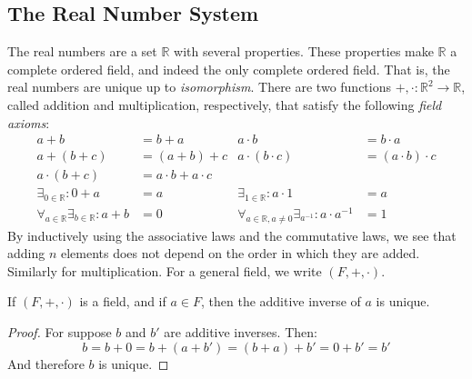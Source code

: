 \documentclass[crop=false,class=book,oneside]{standalone}
\begin{document}
        \subsection{The Real Number System}
            The real numbers are a set $\mathbb{R}$ with several
            properties. These properties make $\mathbb{R}$ a
            complete ordered field, and indeed the only complete
            ordered field. That is, the real numbers are unique
            up to \textit{isomorphism}. There are two functions
            $+,\cdot:\mathbb{R}^{2}\rightarrow\mathbb{R}$, called
            addition and multiplication, respectively, that satisfy
            the following \textit{field axioms}:
            \begin{align}
                a+b&=b+a&
                a\cdot{b}&=b\cdot{a}
                \tag{Commutativity}\\
                a+(b+c)&=(a+b)+c&
                a\cdot(b\cdot{c})&=(a\cdot{b})\cdot{c}
                \tag{Associativity}\\
                a\cdot(b+c)&=a\cdot{b}+a\cdot{c}
                \tag{Distributive Law}\\
                \exists_{0\in\mathbb{R}}:0+a&=a&
                \exists_{1\in\mathbb{R}}:a\cdot{1}&=a
                \tag{Neutral Elements}\\
                \forall_{a\in\mathbb{R}}\exists_{b\in\mathbb{R}}:
                a+b&=0&
                \forall_{a\in\mathbb{R},a\ne{0}}
                \exists_{a^{\minus{1}}}:
                a\cdot{a}^{\minus{1}}&=1
                \tag{Inverse Elements}
            \end{align}
            By inductively using the associative laws and the
            commutative laws, we see that adding $n$ elements
            does not depend on the order in which they are
            added. Similarly for multiplication. For a general
            field, we write $(F,+,\cdot)$.
            \begin{theorem}
                If $(F,+,\cdot)$ is a field, and if $a\in{F}$, then
                the additive inverse of $a$ is unique.
            \end{theorem}
            \begin{proof}
                For suppose $b$ and $b'$ are additive inverses. Then:
                \begin{equation}
                    b=b+0=b+(a+b')=(b+a)+b'=0+b'=b'
                \end{equation}
                And therefore $b$ is unique.
            \end{proof}
\end{document}
